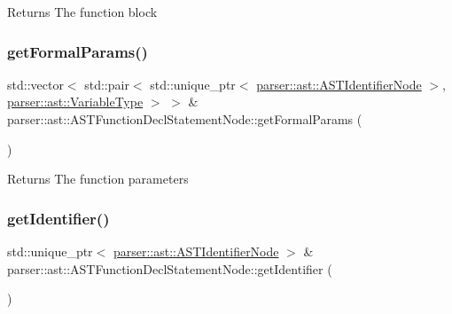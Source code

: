 \begin{DoxyReturn}{Returns}
The function block 
\end{DoxyReturn}
\mbox{\label{classparser_1_1ast_1_1ASTFunctionDeclStatementNode_a21e415e1b48a5f95ce8efff983d35933}} 
\subsubsection{\texorpdfstring{get\+Formal\+Params()}{getFormalParams()}}
{\footnotesize\ttfamily std\+::vector$<$ std\+::pair$<$ std\+::unique\+\_\+ptr$<$ \hyperlink{classparser_1_1ast_1_1ASTIdentifierNode}{parser\+::ast\+::\+A\+S\+T\+Identifier\+Node} $>$, \hyperlink{ASTVariableDeclStatementNode_8h_a1e8e1bde0729627e3a22ffa858d5f3b9}{parser\+::ast\+::\+Variable\+Type} $>$ $>$ \& parser\+::ast\+::\+A\+S\+T\+Function\+Decl\+Statement\+Node\+::get\+Formal\+Params (\begin{DoxyParamCaption}{ }\end{DoxyParamCaption})}

\begin{DoxyReturn}{Returns}
The function parameters 
\end{DoxyReturn}
\mbox{\label{classparser_1_1ast_1_1ASTFunctionDeclStatementNode_a90b14f42d6e5c0e7ace537bc1ed079c1}} 
\subsubsection{\texorpdfstring{get\+Identifier()}{getIdentifier()}}
{\footnotesize\ttfamily std\+::unique\+\_\+ptr$<$ \hyperlink{classparser_1_1ast_1_1ASTIdentifierNode}{parser\+::ast\+::\+A\+S\+T\+Identifier\+Node} $>$ \& parser\+::ast\+::\+A\+S\+T\+Function\+Decl\+Statement\+Node\+::get\+Identifier (\begin{DoxyParamCaption}{ }\end{DoxyParamCaption})}

